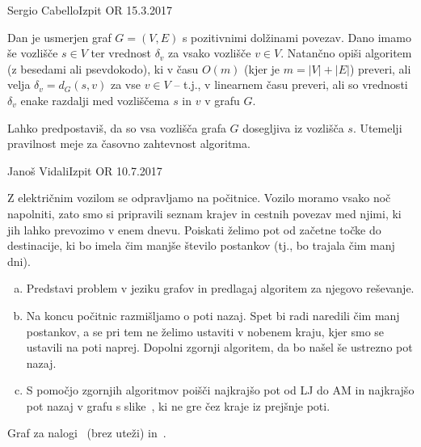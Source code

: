 \begin{naloga}{Sergio Cabello}{Izpit OR 15.3.2017}
\begin{vprasanje}
Dan je usmerjen graf $G = (V, E)$ s pozitivnimi dolžinami povezav.
Dano imamo še vozlišče $s \in V$
ter vrednost $\delta_v$ za vsako vozlišče $v \in V$.
Natančno opiši algoritem (z besedami ali psevdokodo),
ki v času $O(m)$ (kjer je $m = |V| + |E|$) preveri,
ali velja $\delta_v = d_G(s, v)$ za vse $v \in V$
-- t.j., v linearnem času preveri,
ali so vrednosti $\delta_v$
enake razdalji med vozliščema $s$ in $v$ v grafu $G$.

Lahko predpostaviš, da so vsa vozlišča grafa $G$ dosegljiva iz vozlišča $s$.
Utemelji pravilnost meje za časovno zahtevnost algoritma.
\end{vprasanje}
\begin{odgovor}
\end{odgovor}
\end{naloga}


\begin{naloga}{Janoš Vidali}{Izpit OR 10.7.2017}
\begin{vprasanje}[pocitnice]
Z električnim vozilom se odpravljamo na počitnice.
Vozilo moramo vsako noč napolniti,
zato smo si pripravili seznam krajev in cestnih povezav med njimi,
ki jih lahko prevozimo v enem dnevu.
Poiskati želimo pot od začetne točke do destinacije,
ki bo imela čim manjše število postankov (tj., bo trajala čim manj dni).

\begin{enumerate}[(a)]
\item Predstavi problem v jeziku grafov
in predlagaj algoritem za njegovo reševanje.

\item Na koncu počitnic razmišljamo o poti nazaj.
Spet bi radi naredili čim manj postankov,
a se pri tem ne želimo ustaviti v nobenem kraju,
kjer smo se ustavili na poti naprej.
Dopolni zgornji algoritem, da bo našel še ustrezno pot nazaj.

\item S pomočjo zgornjih algoritmov poišči najkrajšo pot od LJ do AM
in najkrajšo pot nazaj v grafu s slike~\fig{},
ki ne gre čez kraje iz prejšnje poti.
\end{enumerate}

\begin{slika}
\pgfslika
\caption{Graf za nalogi~\nal{} (brez uteži) in~.}
\end{slika}
\end{vprasanje}
\begin{odgovor}
\end{odgovor}
\end{naloga}


